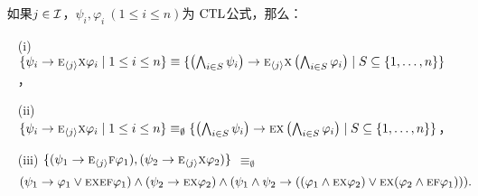 \begin{lemma}~\label{lem:In2NI}
	如果$j\in {\cal I}$，$\psi_i,\varphi_i~(1\le i\le n)$为 $\textrm{CTL}$公式，那么：
	\begin{itemize}
		\item[(i)] $\{\psi_i\rightarrow \textsc{e}_{{\langle{j}\rangle}} \textsc{x} \varphi_i \mid 1\le i\le n\}\equiv
		\{\left(\bigwedge_{i\in S}\psi_i\right)\rightarrow \textsc{e}_{{\langle{j}\rangle}} \textsc{x} \left(\bigwedge_{i\in S}\varphi_i\right)\mid S\subseteq\{1,\dots, n\}\}$，
		
		\item[(ii)] $\{\psi_i\rightarrow \textsc{e}_{{\langle{j}\rangle}} \textsc{x} \varphi_i \mid 1\le i\le n\}\equiv_\emptyset
		\{\left(\bigwedge_{i\in S}\psi_i\right)\rightarrow \textsc{e} \textsc{x} \left(\bigwedge_{i\in S}\varphi_i\right)\mid S\subseteq\{1,\dots, n\}\}$，
		
		\item[(iii)] $\{(\psi_1 \rightarrow \textsc{e}_{{\langle{j}\rangle}}\textsc{f} \varphi_1), (\psi_2 \rightarrow \textsc{e}_{{\langle{j}\rangle}}\textsc{x} \varphi_2)\}$
		$\equiv_\emptyset$
		\begin{equation*}
			(\psi_1 \rightarrow \varphi_1 \vee \textsc{e} \textsc{x} \textsc{e} \textsc{f} \varphi_1)
			\wedge (\psi_2 \rightarrow \textsc{e} \textsc{x} \varphi_2)
			\wedge (\psi_1 \wedge \psi_2 \rightarrow ((\varphi_1 \wedge \textsc{e} \textsc{x} \varphi_2) \vee \textsc{e} \textsc{x} (\varphi_2 \wedge \textsc{e} \textsc{f} \varphi_1))).
		\end{equation*}
	\end{itemize}
\end{lemma}
